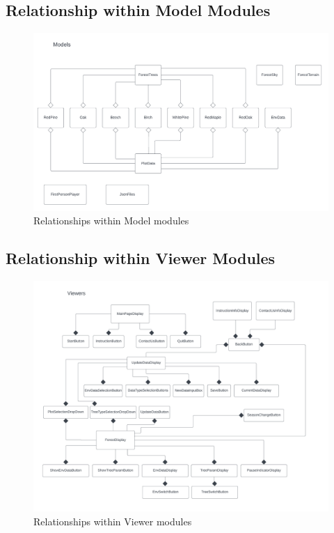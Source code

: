 \documentclass[12pt, titlepage]{article}
\begin{document}
\subsection{Relationship within Model Modules} \label{SecRBMM}
\begin{figure}[H]
\centering
\caption{Relationships within Model modules}
\label{FigRelaModels}
\includegraphics[scale=0.65]{MG_Pictures/Model-Modules.png}
\end{figure}

\newpage

\subsection{Relationship within Viewer Modules} \label{SecRBVM}
\begin{figure}[H]
\centering
\caption{Relationships within Viewer modules}
\label{FigRelaViewers}
\includegraphics[scale=0.65]{MG_Pictures/Viewer-Modules.png}
\end{figure}
\end{document}
